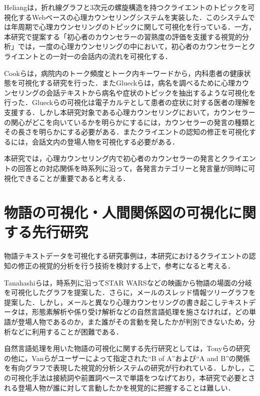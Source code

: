 \documentclass[shuuron]{kuee}
\begin{document}


Heliang\cite{shou}は，折れ線グラフと3次元の螺旋構造を持つクライエントのトピックを可視化するWebベースの心理カウンセリングシステムを実装した．このシステムでは年周期で心理カウンセリングのトピックに関して可視化を行っている．一方，本研究で提案する「初心者のカウンセラーの習熟度の評価を支援する視覚的分析」では，一度の心理カウンセリングの中において，初心者のカウンセラーとクライエントとの一対一の会話内の流れを可視化する．

Cookら\cite{cook2014monologger}は，病院内のトーク頻度とトーク内キーワードから，内科患者の健康状態を可視化する研究を行った．またGlueckら\cite{glueck2018phenolines}は，病名を調べるために心理カウンセリングの会話テキストから病名や症状のトピックを抽出するような可視化を行った．Glueckらの可視化は電子カルテとして患者の症状に対する医者の理解を支援する．しかし本研究対象である心理カウンセリングにおいて，カウンセラーの関心がどこを向いているかを明らかにするには，カウンセラーの発言の種類とその長さを明らかにする必要がある．またクライエントの認知の修正を可視化するには，会話文内の登場人物を可視化する必要がある．


本研究では，心理カウンセリング内で初心者のカウンセラーの発言とクライエントの回答との対応関係を時系列に沿って，各発言カテゴリーと発言量が同時に可視化できることが重要であると考える．


\section{物語の可視化・人間関係図の可視化に関する先行研究}%

物語テキストデータを可視化する研究事例は，本研究におけるクライエントの認知の修正の視覚的分析を行う技術を検討する上で，参考になると考える．

Tanahashiら\cite{tanahashi2012design}は，時系列に沿ってSTAR WARSなどの映画から物語の場面の分岐を可視化したグラフを提案した．さらに，メールのスレッド情報ツリーグラフを提案した\cite{tanahashi2015efficient}．しかし，メールと異なり心理カウンセリングの書き起こしテキストデータは，形態素解析や係り受け解析などの自然言語処理を施さなければ，どの単語が登場人物であるのか，また誰がその言動を発したかが判別できないため，分析などに利用することが困難である．

自然言語処理を用いた物語の可視化に関する先行研究としては，Tonyら\cite{bergstrom2007seeing}の研究の他に，Vanら\cite{van2009mapping}がユーザーによって指定された``B of A''および``A and B''の関係を有向グラフで表現した視覚的分析システムの研究が行われている．しかし，この可視化手法は接続詞や前置詞ベースで単語をつなげており，本研究で必要とされる登場人物が誰に対して言動したかを視覚的に把握することは難しい．
\end{document}
